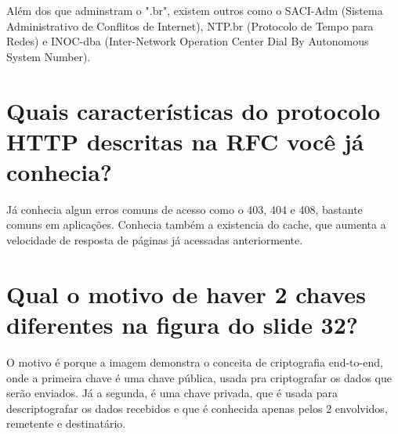 \documentclass{article}
\begin{document}
Além dos que adminstram o ".br", existem outros como o SACI-Adm (Sistema Administrativo de Conflitos de Internet), NTP.br (Protocolo de Tempo para Redes) e INOC-dba (Inter-Network Operation Center Dial By Autonomous System Number).

\section{Quais características do protocolo HTTP descritas na RFC você já conhecia?}

Já conhecia algun erros comuns de acesso como o 403, 404 e 408, bastante comuns em aplicações. 
Conhecia também a existencia do cache, que aumenta a velocidade de resposta de páginas já acessadas anteriormente. 

\section{Qual o motivo de haver 2 chaves diferentes na figura do slide 32?}

O motivo é porque a imagem demonstra o conceita de criptografia end-to-end, onde a primeira chave é uma chave pública, usada pra criptografar os dados que serão enviados. 
Já a segunda, é uma chave privada, que é usada para descriptografar os dados recebidos e que é conhecida apenas pelos 2 envolvidos, remetente e destinatário.
\end{document}
